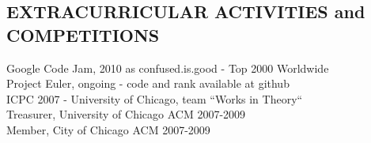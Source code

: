 \documentclass{res}
\begin{document}
\begin{resume}
 
    
\section{EXTRACURRICULAR ACTIVITIES and COMPETITIONS}
    Google Code Jam, 2010 as confused.is.good - Top 2000 Worldwide \\
    Project Euler, ongoing - code and rank available at github \\
    ICPC 2007 - University of Chicago, team ``Works in Theory`` \\
    Treasurer, University of Chicago ACM 2007-2009 \\         
    Member, City of Chicago ACM 2007-2009
 
\end{resume}
    
\end{document}
